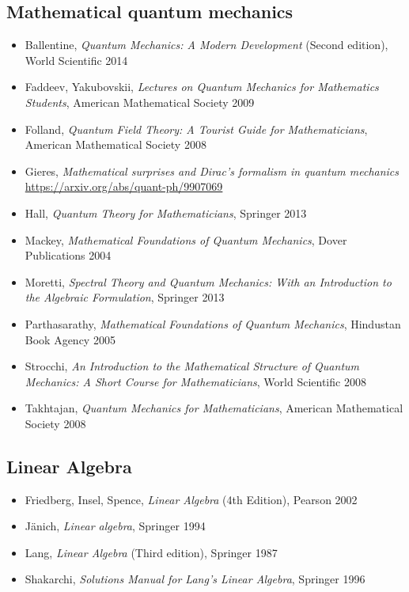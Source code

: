 
\subsection*{Mathematical quantum mechanics}

\begin{itemize}
\item Ballentine, \textit{Quantum Mechanics: A Modern Development} (Second edition), World Scientific 2014
\item Faddeev, Yakubovskii, \textit{Lectures on Quantum Mechanics for Mathematics Students}, American Mathematical Society 2009
\item Folland, \textit{Quantum Field Theory: A Tourist Guide for Mathematicians},  American Mathematical Society 2008
\item Gieres, \textit{Mathematical surprises and Dirac's formalism in quantum mechanics}\\
\url{https://arxiv.org/abs/quant-ph/9907069}
\item Hall, \textit{Quantum Theory for Mathematicians}, Springer 2013
\item Mackey, \textit{Mathematical Foundations of Quantum Mechanics}, Dover Publications 2004
\item Moretti, \textit{Spectral Theory and Quantum Mechanics: With an Introduction to the Algebraic Formulation}, Springer 2013
\item Parthasarathy, \textit{Mathematical Foundations of Quantum Mechanics}, Hindustan Book Agency 2005
\item Strocchi, \textit{An Introduction to the Mathematical Structure of Quantum Mechanics: A Short Course for Mathematicians}, World Scientific 2008
\item Takhtajan, \textit{Quantum Mechanics for Mathematicians}, American Mathematical Society 2008
\end{itemize}


\subsection*{Linear Algebra}

\begin{itemize}
\item Friedberg, Insel, Spence, \textit{Linear Algebra} (4th Edition), Pearson 2002
\item J\"anich, \textit{Linear algebra}, Springer 1994
\item Lang, \textit{Linear Algebra} (Third edition), Springer 1987
\item Shakarchi, \textit{Solutions Manual for Lang's Linear Algebra}, Springer 1996
\end{itemize}


